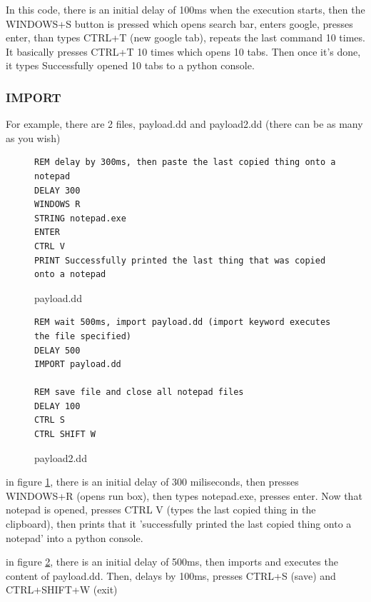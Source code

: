 \documentclass[a4paper,12pt]{article}
\begin{document}
In this code, there is an initial delay of 100ms when the execution starts, then the WINDOWS+S button is pressed which opens search bar, enters google, presses enter, than types CTRL+T (new google tab), repeats the last command 10 times. It basically presses CTRL+T 10 times which opens 10 tabs. Then once it's done, it types Successfully opened 10 tabs to a python console.

\newpage

\subsubsection{IMPORT}\label{ducky_import}
For example, there are 2 files, payload.dd and payload2.dd (there can be as many as you wish)
\begin{figure}[htb]
\begin{small}
\begin{lstlisting}[language=Ducky]
REM delay by 300ms, then paste the last copied thing onto a notepad
DELAY 300
WINDOWS R
STRING notepad.exe
ENTER
CTRL V
PRINT Successfully printed the last thing that was copied onto a notepad
\end{lstlisting}
\end{small}
\caption{payload.dd}\label{import_1}
\end{figure}

\begin{figure}[htb]
\begin{small}
\begin{lstlisting}[language=Ducky]
REM wait 500ms, import payload.dd (import keyword executes the file specified)
DELAY 500
IMPORT payload.dd

REM save file and close all notepad files
DELAY 100
CTRL S
CTRL SHIFT W
\end{lstlisting}
\end{small}
\caption{payload2.dd}\label{import_2}
\end{figure}

in figure \ref{import_1}, there is an initial delay of 300 miliseconds, then presses WINDOWS+R (opens run box), then types notepad.exe, presses enter. Now that notepad is opened, presses CTRL V (types the last copied thing in the clipboard), then prints that it 'successfully printed the last copied thing onto a notepad' into a python console.

in figure \ref{import_2}, there is an initial delay of 500ms, then imports and executes the content of payload.dd. Then, delays by 100ms, presses CTRL+S (save) and CTRL+SHIFT+W (exit)
\end{document}
